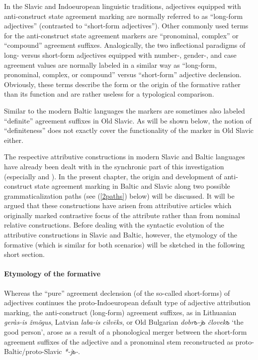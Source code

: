 In the Slavic and Indoeuropean linguistic traditions, adjectives equipped with anti-construct state agreement marking are normally referred to as “long-form adjectives” (contrasted to “short-form adjectives”). Other commonly used terms for the anti-construct state agreement markers are “pronominal, complex” or “compound” agreement suffixes. Analogically, the two inflectional paradigms of long- versus short-form adjectives equipped with number-, gender-, and case agreement values are normally labeled in a similar way as “long-form, pronominal, complex, or compound” versus “short-form” adjective declension. Obviously, these terms describe the form or the origin of the formative rather than its function and are rather useless for a typological comparison.

Similar to the modern Baltic languages the markers are sometimes also labeled “definite” agreement suffixes in Old Slavic. As will be shown below, the notion of “definiteness” does not exactly cover the functionality of the marker in Old Slavic either.

The respective attributive constructions in modern Slavic and Baltic languages have already been dealt with in the synchronic part of this investigation (especially  and ). In the present chapter, the origin and development of anti-construct state agreement marking in Baltic and Slavic along two possible grammaticalization paths (see (\ref{2paths}) below) will be discussed. It will be argued that these constructions have arisen from attributive articles which originally marked contrastive focus of the attribute rather than from nominal relative constructions. Before dealing with the syntactic evolution of the attributive constructions in Slavic and Baltic, however, the etymology of the formative (which is similar for both scenarios) will be sketched in the following short section.

\paragraph{Etymology of the formative} 
Whereas the “pure” agreement declension (of the so-called short-forms) of adjectives continues the proto-Indoeuropean default type of adjective attribution marking, the anti-construct (long-form) agreement suffixes, as in Lithuanian \textit{geràs-is žmõgus}, Latvian \textit{laba-is cilvēks}, or Old Bulgarian \textit{dobrъ-jь človekъ} ‘the good person’, arose as a result of a phonological merger between the short-form agreement suffixes of the adjective and a pronominal stem reconstructed as proto-Baltic/proto-Slavic \textit{*-jь-}.


